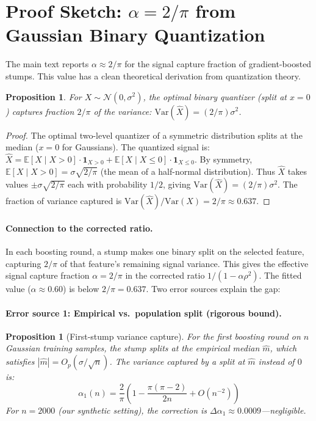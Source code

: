 \documentclass{article}
\newcommand{\Var}{\mathrm{Var}}
\newtheorem{proposition}[theorem]{Proposition}
\begin{document}
\section{Proof Sketch: $\alpha = 2/\pi$ from Gaussian Binary Quantization}

The main text reports $\alpha \approx 2/\pi$ for the signal capture fraction
of gradient-boosted stumps. This value has a clean theoretical derivation
from quantization theory.

\begin{proposition}
For $X \sim \mathcal{N}(0, \sigma^2)$, the optimal binary quantizer
(split at $x = 0$) captures fraction $2/\pi$ of the variance:
$\Var(\hat{X}) = (2/\pi)\sigma^2$.
\end{proposition}

\begin{proof}
The optimal two-level quantizer of a symmetric distribution splits at the
median ($x = 0$ for Gaussians). The quantized signal is:
$\hat{X} = \mathbb{E}[X \mid X > 0] \cdot \mathbf{1}_{X > 0} +
\mathbb{E}[X \mid X \leq 0] \cdot \mathbf{1}_{X \leq 0}$.
By symmetry, $\mathbb{E}[X \mid X > 0] = \sigma\sqrt{2/\pi}$
(the mean of a half-normal distribution). Thus
$\hat{X}$ takes values $\pm\sigma\sqrt{2/\pi}$ each with probability $1/2$,
giving $\Var(\hat{X}) = (2/\pi)\sigma^2$.
The fraction of variance captured is $\Var(\hat{X})/\Var(X) = 2/\pi \approx 0.637$.
\end{proof}

\paragraph{Connection to the corrected ratio.}
In each boosting round, a stump makes one binary split on the selected
feature, capturing $2/\pi$ of that feature's remaining signal variance.
This gives the effective signal capture fraction $\alpha = 2/\pi$ in
the corrected ratio $1/(1-\alpha\rho^2)$.
The fitted value ($\alpha \approx 0.60$) is below $2/\pi = 0.637$.
Two error sources explain the gap:

\paragraph{Error source 1: Empirical vs.\ population split (rigorous bound).}
\begin{proposition}[First-stump variance capture]
\label{prop:first-stump}
For the first boosting round on $n$ Gaussian training samples,
the stump splits at the empirical median $\hat{m}$, which satisfies
$|\hat{m}| = O_p(\sigma/\sqrt{n})$. The variance captured by a split
at $\hat{m}$ instead of $0$ is:
\[
    \alpha_1(n) = \frac{2}{\pi}\left(1 -
    \frac{\pi(\pi - 2)}{2n} + O(n^{-2})\right)
\]
For $n = 2000$ (our synthetic setting), the correction is
$\Delta\alpha_1 \approx 0.0009$---negligible.
\end{proposition}
\end{document}
